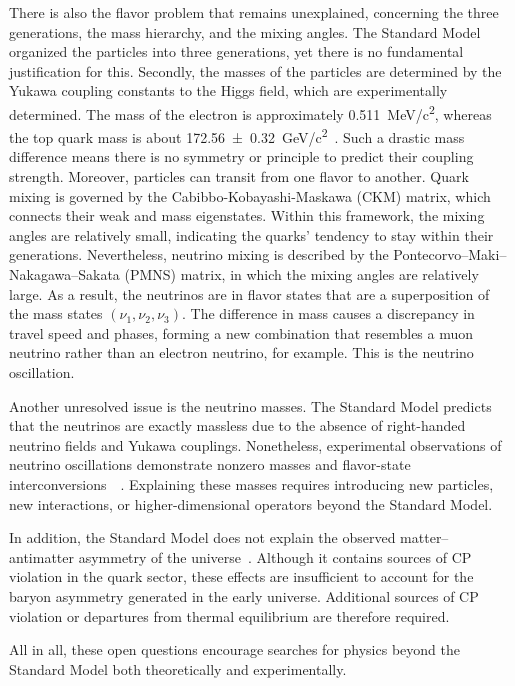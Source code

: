 There is also the flavor problem that remains unexplained, concerning the three generations, the mass hierarchy, and the mixing angles. The Standard Model organized the particles into three generations, yet there is no fundamental justification for this. Secondly, the masses of the particles are determined by the Yukawa coupling constants to the Higgs field, which are experimentally determined. The mass of the electron is approximately \qty{0.511}{\mega\electronvolt/c^2}, whereas the top quark mass is about  \qty[separate-uncertainty = true]{172.56 \pm 0.32}{\giga\electronvolt/c^2}~\cite{PDG2024}. Such a drastic mass difference means there is no symmetry or principle to predict their coupling strength. Moreover, particles can transit from one flavor to another. Quark mixing is governed by the Cabibbo-Kobayashi-Maskawa (CKM) matrix, which connects their weak and mass eigenstates. Within this framework, the mixing angles are relatively small, indicating the quarks’ tendency to stay within their generations. Nevertheless, neutrino mixing is described by the Pontecorvo–Maki–Nakagawa–Sakata (PMNS) matrix, in which the mixing angles are relatively large. As a result, the neutrinos are in flavor states that are a superposition of the mass states $(\nu_1, \nu_2, \nu_3)$. The difference in mass causes a discrepancy in travel speed and phases, forming a new combination that resembles a muon neutrino rather than an electron neutrino, for example. This is the neutrino oscillation. 

Another unresolved issue is the neutrino masses. The Standard Model predicts that the neutrinos are exactly massless due to the absence of right-handed neutrino fields and Yukawa couplings. Nonetheless, experimental observations of neutrino oscillations demonstrate nonzero masses and flavor-state interconversions~\cite{SNO2002}~\cite{SuperK1998}. Explaining these masses requires introducing new particles, new interactions, or higher-dimensional operators beyond the Standard Model.

In addition, the Standard Model does not explain the observed matter--antimatter asymmetry of the universe~\cite{Sakharov1967}. Although it contains sources of CP violation in the quark sector, these effects are insufficient to account for the baryon asymmetry generated in the early universe. Additional sources of CP violation or departures from thermal equilibrium are therefore required.

All in all, these open questions encourage searches for physics beyond the Standard Model both theoretically and experimentally. 

